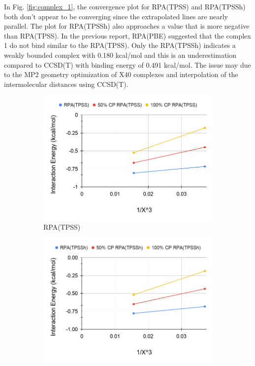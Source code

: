 \documentclass[11pt]{article}
\begin{document}
In Fig. \ref{fig:complex_1}, the convergence plot for RPA(TPSS) and
RPA(TPSSh) both don't appear to be converging since the extrapolated
lines are nearly parallel. The plot for RPA(TPSSh) also approaches a
value that is more negative than RPA(TPSS). In the previous report,
RPA(PBE) suggested that the complex 1 do not bind similar to the
RPA(TPSS). Only the RPA(TPSSh) indicates a weakly bounded complex
with 0.180 kcal/mol and this is an underestimation compared to
CCSD(T) with binding energy of 0.491 kcal/mol. The issue may due to
the MP2 geometry optimization of X40 complexes and interpolation of
the intermolecular distances using CCSD(T).

\begin{figure}[H]
  \centering
  \begin{subfigure}{.5\textwidth}
    \centering
    \includegraphics[scale=0.3]{tpss-8.png}
    \caption{RPA(TPSS)}
    \label{fig:tpss_8}
  \end{subfigure}%
  \begin{subfigure}{.5\textwidth}
    \centering
    \includegraphics[scale=0.3]{tpssh-8.png}

\end{subfigure}
\end{figure}
\end{document}
